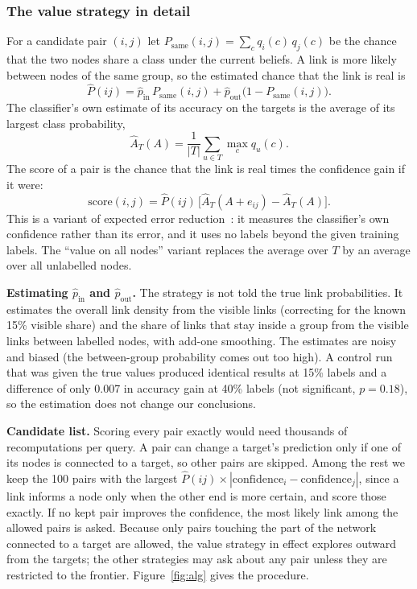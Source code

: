 \documentclass[11pt,a4paper]{article}
\begin{document}
\subsubsection{The value strategy in detail}
For a candidate pair $(i,j)$ let $P_{\text{same}}(i,j)=\sum_c q_i(c)\,q_j(c)$ be the chance that
the two nodes share a class under the current beliefs. A link is more likely between nodes of
the same group, so the estimated chance that the link is real is
\begin{equation}
\hat P(ij)=\hat p_{\text{in}}\,P_{\text{same}}(i,j)+\hat p_{\text{out}}\bigl(1-P_{\text{same}}(i,j)\bigr).
\end{equation}
The classifier's own estimate of its accuracy on the targets is the average of its largest
class probability,
\begin{equation}
\hat A_T(A)=\frac{1}{|T|}\sum_{u\in T}\max_c q_u(c).
\end{equation}
The score of a pair is the chance that the link is real times the confidence gain if it were:
\begin{equation}
\mathrm{score}(i,j)=\hat P(ij)\,\bigl[\hat A_T(A+e_{ij})-\hat A_T(A)\bigr].
\end{equation}
This is a variant of expected error reduction~\cite{roy}: it measures the classifier's own
confidence rather than its error, and it uses no labels beyond the given training labels. The ``value on all nodes'' variant replaces the average over $T$ by an average
over all unlabelled nodes.

\textbf{Estimating $\hat p_{\text{in}}$ and $\hat p_{\text{out}}$.} The strategy is not told
the true link probabilities. It estimates the overall link density from the visible links
(correcting for the known 15\% visible share) and the share of links that stay inside a group
from the visible links between labelled nodes, with add-one smoothing. The estimates are
noisy and biased (the between-group probability comes out too high). A control run that was
given the true values produced identical results at 15\% labels and a difference of only 0.007
in accuracy gain at 40\% labels (not significant, $p=0.18$), so the estimation does not change
our conclusions.

\textbf{Candidate list.} Scoring every pair exactly would need thousands of recomputations
per query. A pair can change a target's prediction only if one of its nodes is connected to
a target, so other pairs are skipped. Among the rest we keep the 100 pairs with the largest
$\hat P(ij)\times|\text{confidence}_i-\text{confidence}_j|$, since a link informs a node only
when the other end is more certain, and score those exactly. If no kept pair improves the
confidence, the most likely link among the allowed pairs is asked. Because only pairs touching
the part of the network connected to a target are allowed, the value strategy in effect explores
outward from the targets; the other strategies may ask about any pair unless they are
restricted to the frontier. Figure~\ref{fig:alg} gives the procedure.
\end{document}
